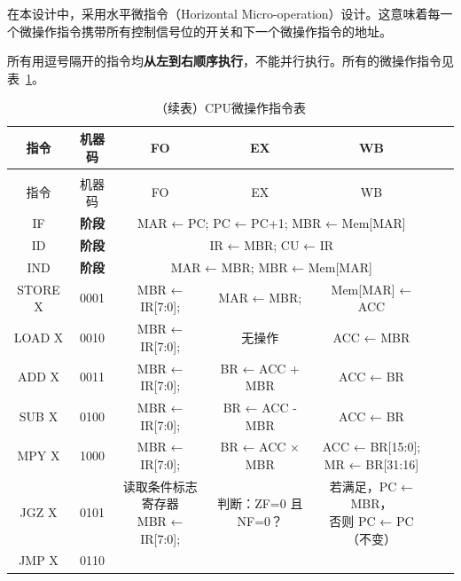 \documentclass[lang=cn,a4paper,newtx]{elegantpaper}
\begin{document}
在本设计中，采用水平微指令（Horizontal Micro-operation）设计。这意味着每一个微操作指令携带所有控制信号位的开关和下一个微操作指令的地址。

所有用逗号隔开的指令均\textbf{从左到右顺序执行}，不能并行执行。所有的微操作指令见表~\ref{tab:five_stage_pipeline}。

\begin{longtable}{ccccccl}
  \caption{CPU微操作指令表} \label{tab:five_stage_pipeline}\\
  \toprule
  指令 & 机器码 &  FO & EX & WB \\
  \midrule
  \endfirsthead

  \toprule
  \caption[]{（续表）CPU微操作指令表} \\
  \toprule
  指令 & 机器码 & FO & EX & WB \\
  \midrule
  \endhead

  \bottomrule
  \endlastfoot
  \rowcolor{red!10}
  IF & \textbf{阶段} & \multicolumn{3}{c}{MAR ← PC; PC ← PC+1; MBR ← Mem[MAR]} \\
  \midrule
  \rowcolor{yellow!10}
  ID & \textbf{阶段} & \multicolumn{3}{c}{IR ← MBR;  CU ← IR}\\
  \midrule
  \rowcolor{green!10}
  IND & \textbf{阶段} & \multicolumn{3}{c}{MAR ← MBR;  MBR ← Mem[MAR]}\\
  \midrule
  STORE X & 0001 &MBR ← IR[7:0];  & MAR ← MBR; & Mem[MAR] ← ACC \\

  LOAD X & 0010 &
  MBR ← IR[7:0];  & 
  无操作 & 
  ACC ← MBR \\
  \midrule
  ADD X & 0011 &
  
  MBR ← IR[7:0];  &
  BR ← ACC + MBR & 
  ACC ← BR \\

  SUB X & 0100 &
  
  MBR ← IR[7:0]; &
  BR ← ACC - MBR & 
  ACC ← BR \\
  MPY X & 1000 &
  
  MBR ← IR[7:0]; &
  BR ← ACC × MBR &
  \makecell{ACC ← BR[15:0];\\ MR ← BR[31:16]} \\
  \midrule
  JGZ X & 0101 &
  
  \makecell{读取条件标志寄存器\\MBR ← IR[7:0];}  & 
  判断：ZF=0 且 NF=0？ & 
  \makecell{若满足，PC ← MBR，\\否则 PC ← PC（不变）} \\

  JMP X & 0110 &
  

\end{longtable}
\end{document}
